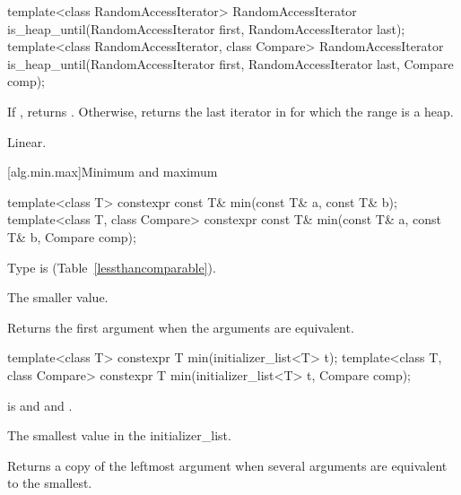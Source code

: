 \begin{itemdescr}
\pnum
\returns {}
\end{itemdescr}

%
\begin{itemdecl}
  template<class RandomAccessIterator>
    RandomAccessIterator is_heap_until(RandomAccessIterator first, RandomAccessIterator last);
  template<class RandomAccessIterator, class Compare>
    RandomAccessIterator is_heap_until(RandomAccessIterator first, RandomAccessIterator last,
      Compare comp);
\end{itemdecl}


\begin{itemdescr}
\pnum
\returns If , returns
. Otherwise, returns
the last iterator  in  for which the
range  is a heap.

\pnum
\complexity Linear.
\end{itemdescr}


[alg.min.max]{Minimum and maximum}

%
\begin{itemdecl}
template<class T> constexpr const T& min(const T& a, const T& b);
template<class T, class Compare>
  constexpr const T& min(const T& a, const T& b, Compare comp);
\end{itemdecl}

\begin{itemdescr}
\pnum
\requires
Type
is
 (Table~\ref{lessthancomparable}).

\pnum
\returns
The smaller value.

\pnum
\notes
Returns the first argument when the arguments are equivalent.
\end{itemdescr}

%
\begin{itemdecl}
template<class T>
  constexpr T min(initializer_list<T> t);
template<class T, class Compare>
  constexpr T min(initializer_list<T> t, Compare comp);
\end{itemdecl}

\begin{itemdescr}
\pnum
\requires {} is  and  and
.

\pnum
\returns The smallest value in the initializer_list.

\pnum
\remarks Returns a copy of the leftmost argument when several arguments are equivalent to the smallest.\
\end{itemdescr}


